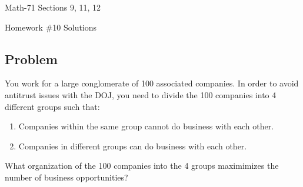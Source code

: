\documentclass[letterpaper,12pt,fleqn]{article}
\begin{document}
\begin{center}
  \large
  Math-71 Sections 9, 11, 12

  \Large
  Homework \#10 Solutions
\end{center}

\subsection*{Problem}

You work for a large conglomerate of 100 associated companies.  In order to avoid antitrust issues with the DOJ, you need
to divide the 100 companies into 4 different groups such that:
\begin{enumerate}
\item Companies within the same group cannot do business with each other.
\item Companies in different groups can do business with each other.
\end{enumerate}
What organization of the 100 companies into the 4 groups maximimizes the number of business opportunities?
\end{document}
